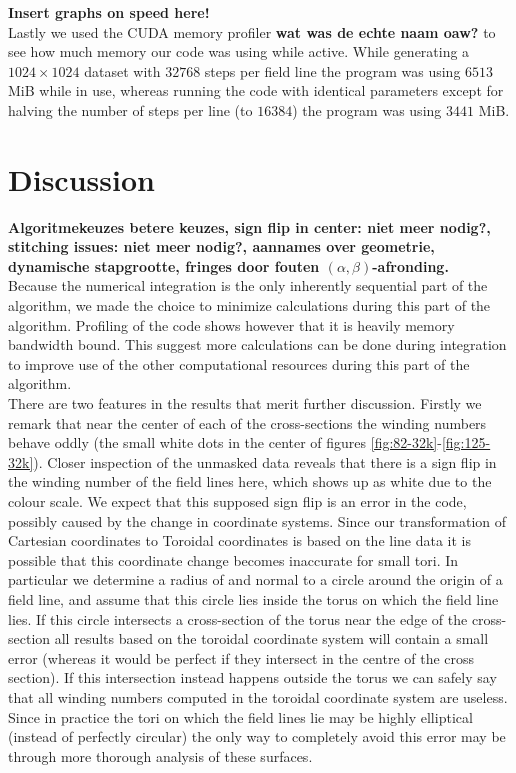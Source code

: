 \documentclass{article}
\begin{document}
\textbf{Insert graphs on speed here!}\\

Lastly we used the CUDA memory profiler \textbf{wat was de echte naam oaw?} to see how much memory our code was using while active. While generating a $1024\times 1024$ dataset with $32768$ steps per field line the program was using $6513$ MiB while in use, whereas running the code with identical parameters except for halving the number of steps per line (to $16384$) the program was using $3441$ MiB.



\section{Discussion}
{\bf Algoritmekeuzes \textrightarrow betere keuzes, sign flip in center: niet meer nodig?, stitching issues: niet meer nodig?, aannames over geometrie, dynamische stapgrootte, fringes door fouten $(\alpha,\beta)$-afronding.}\\
Because the numerical integration is the only inherently sequential part of the algorithm, we made the choice to minimize calculations during this part of the algorithm. Profiling of the code shows however that it is heavily memory bandwidth bound. This suggest more calculations can be done during integration to improve use of the other computational resources during this part of the algorithm.\\

There are two features in the results that merit further discussion. Firstly we remark that near the center of each of the cross-sections the winding numbers behave oddly (the small white dots in the center of figures \ref{fig:82-32k}-\ref{fig:125-32k}). Closer inspection of the unmasked data reveals that there is a sign flip in the winding number of the field lines here, which shows up as white due to the colour scale. We expect that this supposed sign flip is an error in the code, possibly caused by the change in coordinate systems. Since our transformation of Cartesian coordinates to Toroidal coordinates is based on the line data it is possible that this coordinate change becomes inaccurate for small tori. In particular we determine a radius of and normal to a circle around the origin of a field line, and assume that this circle lies inside the torus on which the field line lies. If this circle intersects a cross-section of the torus near the edge of the cross-section all results based on the toroidal coordinate system will contain a small error (whereas it would be perfect if they intersect in the centre of the cross section). If this intersection instead happens outside the torus we can safely say that all winding numbers computed in the toroidal coordinate system are useless. Since in practice the tori on which the field lines lie may be highly elliptical (instead of perfectly circular) the only way to completely avoid this error may be through more thorough analysis of these surfaces.\\
\end{document}
